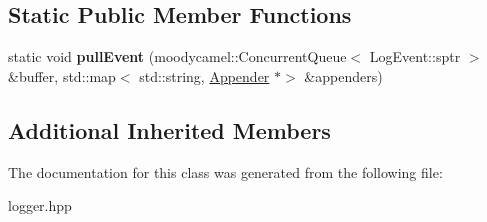 \subsection*{Static Public Member Functions}
\begin{DoxyCompactItemize}
\item 
\mbox{\label{classDAQ_1_1AsLogger_a042eee77197e36286ef5e763a230903b}} 
static void {\bfseries pull\+Event} (moodycamel\+::\+Concurrent\+Queue$<$ Log\+Event\+::sptr $>$ \&buffer, std\+::map$<$ std\+::string, \hyperlink{classDAQ_1_1Appender}{Appender} $\ast$$>$ \&appenders)
\end{DoxyCompactItemize}
\subsection*{Additional Inherited Members}


The documentation for this class was generated from the following file\+:\begin{DoxyCompactItemize}
\item 
logger.\+hpp\end{DoxyCompactItemize}
